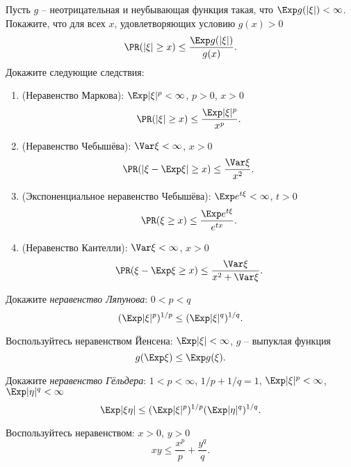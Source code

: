 

\begin{problem} 
Пусть $g$ -- неотрицательная и неубывающая функция такая, что $\Exp g(|\xi|) < \infty$. Покажите, что для всех $x$, удовлетворяющих условию $g(x) > 0$
\[
\PR(|\xi| \geq x) \leq \frac{ \Exp g(|\xi|) }{ g(x)}.
\]
Докажите следующие следствия:
\begin{enumerate}
\item (Неравенство Маркова): $\Exp |\xi|^p < \infty$, $p > 0$, $x > 0$
\[
\PR(|\xi| \geq x) \leq \frac{ \Exp |\xi|^p }{ x^p}.
\]
\item (Неравенство Чебышёва): $\Var \xi < \infty$, $x > 0$
\[
\PR(|\xi - \Exp \xi| \geq x) \leq \frac{ \Var \xi }{ x^2}.
\]
\item (Экспоненциальное неравенство Чебышёва): $\Exp e^{t \xi} < \infty$, $t > 0$
\[
\PR(\xi \geq x) \leq \frac{ \Exp e^{t \xi} }{ e^{t x} }.
\]
\item (Неравенство Кантелли): $\Var \xi < \infty$, $x > 0$
\[
\PR( \xi - \Exp \xi \geq x) \leq \frac{ \Var \xi }{ x^2 + \Var \xi}.
\]
\end{enumerate}

\end{problem}

\begin{problem}
Докажите \textit{неравенство Ляпунова}: $0 < p < q$ 
\[
(\Exp |\xi|^p)^{1/p} \leq (\Exp |\xi|^q)^{1/q}. 
\]
\end{problem}

\begin{ordre}
Воспользуйтесь неравенством Йенсена: $\Exp |\xi| < \infty$, $g$ -- выпуклая функция
\[
g(\Exp \xi) \leq \Exp g(\xi). 
\]

\end{ordre}

\begin{problem}
Докажите \textit{неравенство Гёльдера}: $1 < p < \infty$, $1/p + 1/q = 1$, $\Exp |\xi|^p < \infty$, $\Exp |\eta|^q < \infty$  
\[
\Exp |\xi \eta | \leq (\Exp |\xi|^p)^{1/p} (\Exp |\eta|^q)^{1/q}. 
\]
\end{problem}

\begin{ordre}
Воспользуйтесь неравенством: $x > 0$, $y > 0$ 
\[
x y \leq \frac{x^p}{p} + \frac{y^q}{q}.  
\]

\end{ordre}

